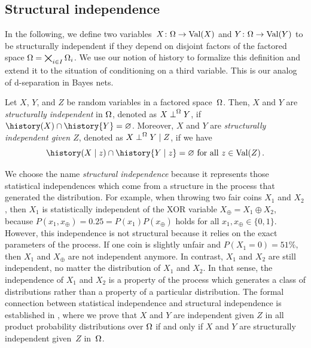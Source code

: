 \documentclass[USenglish,onecolumn]{article}
\begin{document}
\subsection{Structural independence}

In the following, we define two variables~$X\colon\Omega\to\textnormal{Val}(X)$ and $Y\colon\Omega\to\textnormal{Val}(Y)$ to be structurally independent if they depend on disjoint factors of the factored space $\Omega=\bigtimes_{i\in I}  \Omega_i$. We use our notion of history to formalize this definition and extend it to the situation of conditioning on a third variable. This is our analog of d-separation in Bayes nets.
\begin{definition}\label{def:structuralindependence}
  Let $X$, $Y$, and $Z$ be random variables in a factored space~$\Omega$. Then, $X$ and $Y$ are \emph{structurally independent} in $\Omega$, denoted as $X \mathrel{\perp}^\Omega Y$, if $\history(X) \sect  \history{Y} = \nothing$.
  Moreover, $X$ and $Y$ are \emph{structurally independent given $Z$}, denoted as
  $X \mathrel{\perp}^\Omega Y \mid Z$, if we have
  \[\history(X \mid z) \sect \history{Y \given z} = \nothing \text{ for all } z\in \Val(Z)\,.\]
\end{definition}

We choose the name \emph{structural independence} because it represents those statistical independences which come from a structure in the process that generated the distribution. For example, when throwing two fair coins $X_1$ and $X_2$, then $X_1$ is statistically independent of the XOR variable $X_\oplus=X_1\oplus X_2$, because $P(x_1, x_\oplus)=0.25=P(x_1)P(x_\oplus)$ holds for all $x_1,x_\oplus \in\{0,1\}$. However, this independence is not structural because it relies on the exact parameters of the process. If one coin is slightly unfair and $P(X_1=0)=51\%$, then $X_1$ and $X_\oplus$ are not independent anymore. In contrast, $X_1$ and $X_2$ are still independent, no matter the distribution of $X_1$ and $X_2$. In that sense, the independence of $X_1$ and $X_2$ is a property of the process which generates a class of distributions rather than a property of a particular distribution. The formal connection between statistical independence and structural independence is established in , where we prove that $X$ and $Y$ are independent given $Z$ in all product probability distributions over $\Omega$ if and only if $X$ and $Y$ are structurally independent given~$Z$ in~$\Omega$.
\end{document}
